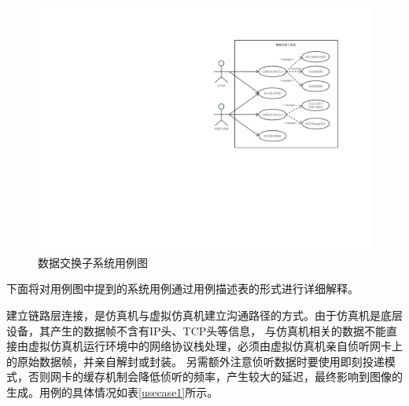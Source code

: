 \begin{figure}[h!]
    \begin{center}
        \includegraphics[width=\textwidth]{pictures/usecase.pdf}
        \caption{数据交换子系统用例图}
        \label{usecase}
    \end{center}
\end{figure}

\par
下面将对用例图中提到的系统用例通过用例描述表的形式进行详细解释。
\par
建立链路层连接，是仿真机与虚拟仿真机建立沟通路径的方式。由于仿真机是底层设备，其产生的数据帧不含有IP头、TCP头等信息，
与仿真机相关的数据不能直接由虚拟仿真机运行环境中的网络协议栈处理，必须由虚拟仿真机亲自侦听网卡上的原始数据帧，并亲自解封或封装。
另需额外注意侦听数据时要使用即刻投递模式，否则网卡的缓存机制会降低侦听的频率，产生较大的延迟，最终影响到图像的生成。用例的具体情况如表\ref{usecase1}所示。

